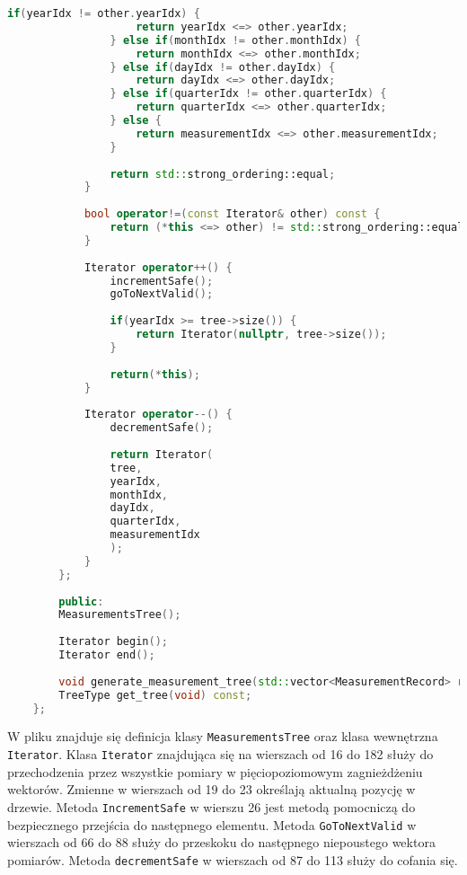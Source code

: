 \begin{lstlisting}[caption=Zawartość pliku \texttt{MeasurementsTree.hpp}, label={lst:measurementreehpp}, language=C++]
				if(yearIdx != other.yearIdx) {
					return yearIdx <=> other.yearIdx;
				} else if(monthIdx != other.monthIdx) {
					return monthIdx <=> other.monthIdx;
				} else if(dayIdx != other.dayIdx) {
					return dayIdx <=> other.dayIdx;
				} else if(quarterIdx != other.quarterIdx) {
					return quarterIdx <=> other.quarterIdx;
				} else {
					return measurementIdx <=> other.measurementIdx;
				} 
				
				return std::strong_ordering::equal;
			}	
			
			bool operator!=(const Iterator& other) const {
				return (*this <=> other) != std::strong_ordering::equal;
			}	
			
			Iterator operator++() {
				incrementSafe();
				goToNextValid();
				
				if(yearIdx >= tree->size()) {
					return Iterator(nullptr, tree->size());
				}
				
				return(*this);
			}
			
			Iterator operator--() {
				decrementSafe();
				
				return Iterator(
				tree,
				yearIdx,
				monthIdx,
				dayIdx,
				quarterIdx,
				measurementIdx
				);
			}
		};
		
		public:
		MeasurementsTree();
		
		Iterator begin(); 
		Iterator end(); 
		
		void generate_measurement_tree(std::vector<MeasurementRecord> records);
		TreeType get_tree(void) const;
	};
\end{lstlisting}

W pliku znajduje się definicja klasy \texttt{MeasurementsTree} oraz klasa wewnętrzna \texttt{Iterator}.
Klasa \texttt{Iterator} znajdująca się na wierszach od 16 do 182 służy do przechodzenia przez wszystkie pomiary w pięciopoziomowym zagnieżdżeniu wektorów. Zmienne w wierszach od 19 do 23 określają aktualną pozycję w drzewie.	Metoda \texttt{IncrementSafe} w wierszu 26 jest metodą pomocniczą do bezpiecznego przejścia do następnego elementu.
Metoda \texttt{GoToNextValid} w wierszach od 66 do 88 służy do przeskoku do następnego niepoustego wektora pomiarów.
Metoda \texttt{decrementSafe} w wierszach od 87 do 113 służy do cofania się.